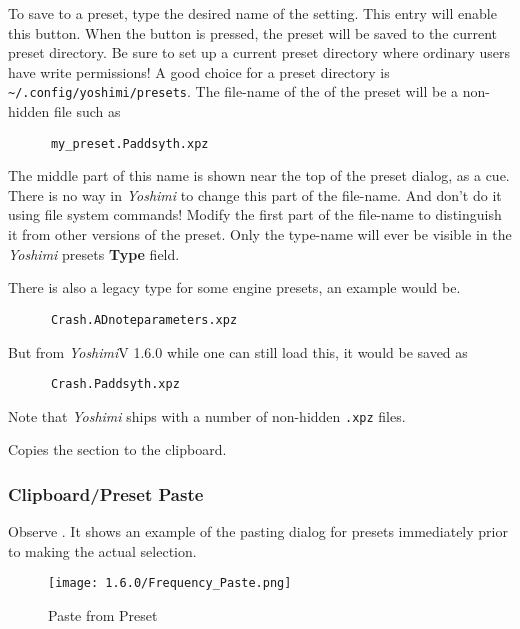    To save to a preset, type the desired name of the setting.  This entry
   will enable this button.  When the button is pressed, the preset will
   be saved to the current preset directory.
   Be sure to set up a current preset directory where ordinary users have
   write permissions!
   A good choice for a preset directory is
   \texttt{\textasciitilde/.config/yoshimi/presets}.
   The file-name of the of the preset will be a non-hidden file such as

   \begin{verbatim}
      my_preset.Paddsyth.xpz
   \end{verbatim}

   The middle part of this name is shown near the top of the preset dialog, as
   a cue.
   There is no way in \textsl{Yoshimi} to change this part of the file-name.
   And don't do it using file system commands!  Modify the first part of the
   file-name to distinguish it from other versions of the preset.
   Only the type-name will ever be visible in the \textsl{Yoshimi}
   presets \textbf{Type} field.

   There is also a legacy type for some engine presets, an example would be.
   \begin{verbatim}
      Crash.ADnoteparameters.xpz
   \end{verbatim}
   But from \textsl{Yoshimi}V 1.6.0 while one can still load this, it would be saved as
   \begin{verbatim}
      Crash.Paddsyth.xpz
   \end{verbatim}

   Note that \textsl{Yoshimi} ships with a number of non-hidden \texttt{.xpz}
   files.

   Copies the section to the clipboard.

\subsubsection{Clipboard/Preset Paste}
\label{subsubsec:clipboard_paste}

   Observe .
   It shows an example of the pasting dialog for presets immediately prior to making
   the actual selection.

\begin{figure}[H]
   \centering
   \texttt{[image: 1.6.0/Frequency\_Paste.png]}
   \caption[Paste from Preset]{Paste from Preset}
   \label{fig:paste_to_clipboard}
\end{figure}

